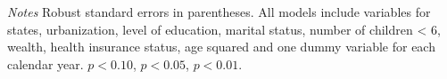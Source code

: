 \documentclass[12pt,english]{article}
\begin{document}
\begin{table}[p]
\begin{center}
\begin{adjustbox}{max width=\linewidth}
\begin{threeparttable}
{\begin{tabular}{l*{6}{S S}}
					\end{tabular}
					\begin{tablenotes}
						\item \footnotesize \textit{Notes} Robust standard errors in parentheses. All models include variables for  states, urbanization, level of education, marital status, number of children < 6, wealth, health insurance status, age squared and one dummy variable for each calendar year. \sym{*} \(p<0.10\), \sym{**} \(p<0.05\), \sym{***} \(p<0.01\).
					\end{tablenotes}
				}
			\end{threeparttable}
		\end{adjustbox}
	\end{center}
\end{table} 

\clearpage
\end{document}
